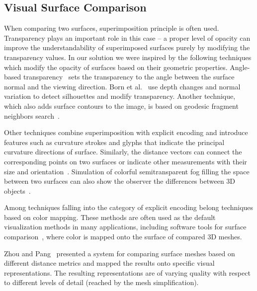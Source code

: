 \documentclass[final,5p,times]{elsarticle}
\begin{document}
\subsection{Visual Surface Comparison}
When comparing two surfaces, superimposition principle is often used.
Transparency plays an important role in this case -- a proper level of opacity can improve the understandability of superimposed surfaces purely by modifying the transparency values. 
In our solution we were inspired by the following techniques which modify the opacity of surfaces based on their geometric properties. 
Angle-based transparency~\cite{hummel2010iris} sets the transparency to the angle between the surface normal and the viewing direction. 
Born et al.~\cite{born2009illustrative} use depth changes and normal variation to detect silhouettes and modify transparency. 
Another technique, which also adds surface contours to the image, is based on geodesic fragment neighbors search~\cite{carnecky2013smart}. 

Other techniques \cite{interrante1997conveying,diewald2000anisotropic,weigle2005visualizing} combine superimposition with explicit encoding and introduce features such as curvature strokes and glyphs that indicate the principal curvature directions of surface.
Similarly, the distance vectors can connect the corresponding points on two surfaces or indicate other measurements with their size and orientation~\cite{busking2011image}. 
Simulation of colorful semitransparent fog filling the space between two surfaces can also show the observer the differences between 3D objects~\cite{busking2011image}.

Among techniques falling into the category of explicit encoding belong techniques based on color mapping. 
These methods are often used as the default visualization methods in many applications, including software tools for surface comparison~\cite{CCompare,ymca}, where color is mapped onto the surface of compared 3D meshes. 

Zhou and Pang~\cite{Zhou2001} presented a system for comparing surface meshes based on different distance metrics and mapped the results onto specific visual representations.
The resulting representations are of varying quality with respect to different levels of detail (reached by the mesh simplification).
\end{document}
